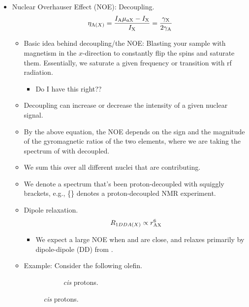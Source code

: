 \documentclass[../notes.tex]{subfiles}
\begin{document}
\begin{itemize}
\begin{itemize}
    \end{itemize}
    \item Nuclear Overhauser Effect (NOE): Decoupling.
    \begin{equation*}
        \eta_{\ce{A}(X)} = \frac{I_{\ce{A}}\mu_{a\ce{X}}-I_{\ce{X}}}{I_{\ce{X}}} = \frac{\gamma_{\ce{X}}}{2\gamma_{\ce{A}}}
    \end{equation*}
    \begin{itemize}
        \item Basic idea behind decoupling/the NOE: Blasting your sample with magnetism in the $x$-direction to constantly flip the spins and saturate them. Essentially, we saturate a given frequency or transition with rf radiation.
        \begin{itemize}
            \item Do I have this right??
        \end{itemize}
        \item Decoupling can increase or decrease the intensity of a given nuclear signal.
        \item By the above equation, the NOE depends on the sign and the magnitude of the gyromagnetic ratios of the two elements, where we are taking the spectrum of  with  decoupled.
        \item We sum this over all different nuclei that are contributing.
        \item We denote a spectrum that's been proton-decoupled with squiggly brackets, e.g., \{\} denotes a proton-decoupled  NMR experiment.
        \item Dipole relaxation.
        \begin{equation*}
            R_{1DDA(X)} \propto r_{\ce{AX}}^6
        \end{equation*}
        \begin{itemize}
            \item We expect a large NOE when  and  are close, and  relaxes primarily by dipole-dipole (DD) from .
        \end{itemize}
        \item Example: Consider the following olefin.
        \begin{figure}[H]
            \centering
            \footnotesize
            \begin{subfigure}[b]{0.3\linewidth}
                \centering
                \caption{\emph{cis} protons.}

\end{subfigure}
\end{figure}
\end{itemize}
\end{itemize}
\end{document}
